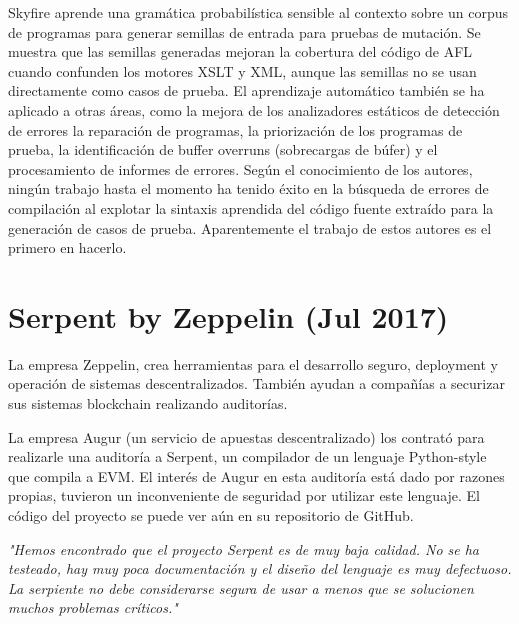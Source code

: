 Skyfire\cite{Wang:Chen:Wei:Liu:Skyfire} aprende una gramática probabilística sensible al contexto sobre un corpus de programas para generar semillas de entrada para pruebas de mutación. Se muestra que las semillas generadas mejoran la cobertura del código de AFL\cite{AFL} cuando confunden los motores XSLT y XML, aunque las semillas no se usan directamente como casos de prueba. El aprendizaje automático también se ha aplicado a otras áreas, como la mejora de los analizadores estáticos de detección de errores \cite{Heo:Oh:Yi:Unsound}\cite{Koc:Saadatpanah:Jeffrey:Porter:False} la reparación de programas\cite{Koukoutos:Raghothaman:Kneuss:Kuncak}\cite{White:Tufano:Martinez:Monperrus}, la priorización de los programas de prueba\cite{Chen:Bai:Hao:Xiong:Zhang}, la identificación de buffer overruns (sobrecargas de búfer)\cite{Choi:Jeong:Oh:Choo:BufferOverruns} y el procesamiento de informes de errores\cite{Xuan:Ming:Buggy}\cite{Lam:Anh:Nguyen:Nguyen:DeepLearning}. Según el conocimiento de los autores, ningún trabajo hasta el momento ha tenido éxito en la búsqueda de errores de compilación al explotar la sintaxis aprendida del código fuente extraído para la generación de casos de prueba. Aparentemente el trabajo de estos autores es el primero en hacerlo.

\section{Serpent by Zeppelin (Jul 2017)}

La empresa Zeppelin, crea herramientas para el desarrollo seguro, deployment y operación de sistemas descentralizados. También ayudan a compañías a securizar sus sistemas blockchain realizando auditorías.

La empresa Augur (un servicio de apuestas descentralizado) los contrató para realizarle una auditoría a Serpent, un compilador de un lenguaje Python-style que compila a EVM. El interés de Augur en esta auditoría está dado por razones propias, tuvieron un inconveniente de seguridad por utilizar este lenguaje. El código del proyecto se puede ver aún en su repositorio de GitHub\cite{SerpentRepository}.

\begin{displayquote}
    \textit{"Hemos encontrado que el proyecto Serpent es de muy baja calidad. No se ha testeado, hay muy poca documentación y el diseño del lenguaje es muy defectuoso. La serpiente no debe considerarse segura de usar a menos que se solucionen muchos problemas críticos."}
\end{displayquote}

